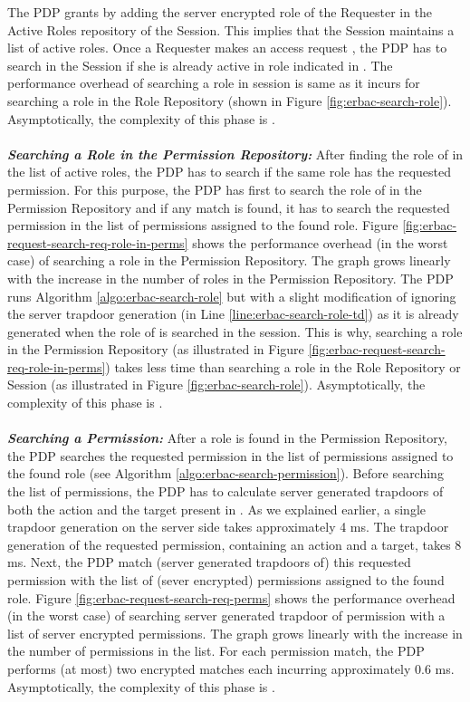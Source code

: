 \documentclass[epsfig,a4paper,11pt,titlepage]{book}
\numberwithin{algorithm}{chapter}
\begin{document}
The \gls{PDP} grants  by adding the server encrypted role of the Requester in the Active Roles repository of the Session. This implies that the Session maintains a list of active roles. Once a Requester makes an access request , the \gls{PDP} has to search in the Session if she is already active in role indicated in . The performance overhead of searching a role in session is same as it incurs for searching a role in the Role Repository (shown in Figure \ref{fig:erbac-search-role}). Asymptotically, the complexity of this phase is . \\ \\
\noindent \emph{\textbf{Searching a Role in the Permission Repository:}}
After finding the role of  in the list of active roles, the \gls{PDP} has to search if the same role has the requested permission. For this purpose, the \gls{PDP} has first to search the role of  in the Permission Repository and if any match is found, it has to search the requested permission in the list of permissions assigned to the found role. Figure \ref{fig:erbac-request-search-req-role-in-perms} shows the performance overhead (in the worst case) of searching a role in the Permission Repository. The graph grows linearly with the increase in the number of roles in the Permission Repository. The \gls{PDP} runs Algorithm \ref{algo:erbac-search-role} but with a slight modification of ignoring the server trapdoor generation (in Line \ref{line:erbac-search-role-td}) as it is already generated when the role of  is searched in the session. This is why, searching a role in the Permission Repository (as illustrated in Figure \ref{fig:erbac-request-search-req-role-in-perms}) takes less time than searching a role in the Role Repository or Session (as illustrated in Figure \ref{fig:erbac-search-role}). Asymptotically, the complexity of this phase is . \\ \\
\noindent \emph{\textbf{Searching a Permission:}}
After a role is found in the Permission Repository, the \gls{PDP} searches the requested permission in the list of permissions assigned to the found role (see Algorithm \ref{algo:erbac-search-permission}). Before searching the list of permissions, the \gls{PDP} has to calculate server generated trapdoors of both the action and the target present in . As we explained earlier, a single trapdoor generation on the server side takes approximately 4 \gls{ms}. The trapdoor generation of the requested permission, containing an action and a target, takes 8 \gls{ms}. Next, the \gls{PDP} match (server generated trapdoors of) this requested permission with the list of (sever encrypted) permissions assigned to the found role. Figure \ref{fig:erbac-request-search-req-perms} shows the performance overhead (in the worst case) of searching server generated trapdoor of permission with a list of server encrypted permissions. The graph grows linearly with the increase in the number of permissions in the list. For each permission match, the \gls{PDP} performs (at most) two encrypted matches each incurring approximately 0.6 \gls{ms}. Asymptotically, the complexity of this phase is . \\ \\
\end{document}
